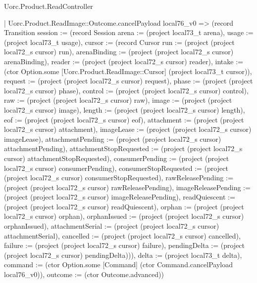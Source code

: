 \begin{lexlean}{Uorc.Product.ReadController}
\begin{semanticmodule}
{    | Uorc.Product.ReadImage::Outcome.cancelPayload local76_v0 => (record Transition {session := (record Session {arena := (project local73_t arena), usage := (project local73_t usage), cursor := (record Cursor {run := (project (project local72_s cursor) run), arenaBinding := (project (project local72_s cursor) arenaBinding), reader := (project (project local72_s cursor) reader), intake := (ctor Option.some [Uorc.Product.ReadImage::Cursor] (project local73_t cursor)), request := (project (project local72_s cursor) request), phase := (project (project local72_s cursor) phase), control := (project (project local72_s cursor) control), raw := (project (project local72_s cursor) raw), image := (project (project local72_s cursor) image), length := (project (project local72_s cursor) length), eof := (project (project local72_s cursor) eof), attachment := (project (project local72_s cursor) attachment), imageLease := (project (project local72_s cursor) imageLease), attachmentPending := (project (project local72_s cursor) attachmentPending), attachmentStopRequested := (project (project local72_s cursor) attachmentStopRequested), consumerPending := (project (project local72_s cursor) consumerPending), consumerStopRequested := (project (project local72_s cursor) consumerStopRequested), rawReleasePending := (project (project local72_s cursor) rawReleasePending), imageReleasePending := (project (project local72_s cursor) imageReleasePending), readQuiescent := (project (project local72_s cursor) readQuiescent), orphan := (project (project local72_s cursor) orphan), orphanIssued := (project (project local72_s cursor) orphanIssued), attachmentSerial := (project (project local72_s cursor) attachmentSerial), cancelled := (project (project local72_s cursor) cancelled), failure := (project (project local72_s cursor) failure), pendingDelta := (project (project local72_s cursor) pendingDelta)})}), delta := (project local73_t delta), command := (ctor Option.some [Command] (ctor Command.cancelPayload local76_v0)), outcome := (ctor Outcome.advanced)})
}
\end{semanticmodule}
\end{lexlean}
